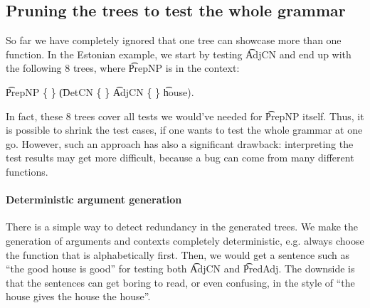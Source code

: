 


\subsection{Pruning the trees to test the whole grammar}
\label{sec:pruning_all}

So far we have completely ignored that one tree can showcase more than
one function. In the Estonian example, we start
by testing \t{AdjCN} and end up with the following 8 trees, where
\t{PrepNP} is in the context:
\begin{EmptyItem}
\t{PrepNP} \{  \}
             { \t{(DetCN}} \{  \}
             {\t{AdjCN}}  \{ \}
             { \t{house)}}.
\end{EmptyItem}
In fact, these 8 trees cover all tests we would've needed for
\t{PrepNP} itself. Thus, it is possible to shrink the test cases,
if one wants to test the whole grammar at one go. However, such an
approach has also a significant drawback: interpreting the test
results may get more difficult, because a bug can come from many
different functions.


\paragraph{Deterministic argument generation}
There is a simple way to detect redundancy in the generated trees. We
make the generation of arguments and contexts completely
deterministic, e.g. always choose the function that is alphabetically
first. Then, we would get a sentence such as ``the good house is
good'' for testing both \t{AdjCN} and \t{PredAdj}. The downside is
that the sentences can get boring to read, or even confusing, in the
style of ``the house gives the house the house''.

